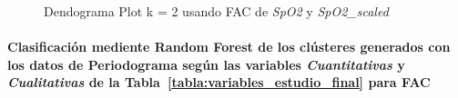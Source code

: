 \begin{figure}[ht]
    \centering
    \hfill
    \caption{Dendograma Plot k = 2 usando FAC de \textit{SpO2} y \textit{SpO2\_scaled}}\label{fig:acf_ctg_spo2}
\end{figure}

\paragraph{Clasificación mediente Random Forest de los clústeres generados con los datos de {\color{blue}Periodograma} según las variables \textit{Cuantitativas} y \textit{Cualitativas} de la Tabla~\ref{tabla:variables_estudio_final} para FAC}

